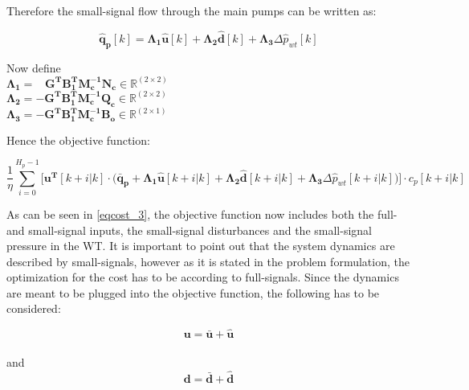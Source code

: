 Therefore the small-signal flow through the main pumps can be written as: 

 \begin{equation}
 \bm{\hat{q}_{p}}[k] =   \bm{\Lambda_1} \bm{\hat{u}}[k] + \bm{\Lambda_2} \bm{\hat{d}}[k] + \bm{\Lambda_3} \Delta \hat{p}_{wt}[k]
 \label{pumpflows_simplified}
\end{equation}

\begin{minipage}[t]{0.80\textwidth}
Now define\\
\hspace*{8mm} $\bm{\Lambda_1} = \,\,\,\,\, \bm{G^T} \bm{B_{1}^T}\bm{M_c^{-1}}\bm{N_c} \in \pmb{\mathbb{R}}^{(2 \times 2)}$ \\
\hspace*{8mm} $\bm{\Lambda_2} = -\bm{G^T} \bm{B_{1}^T}\bm{M_c^{-1}}\bm{Q_c} \in \pmb{\mathbb{R}}^{(2 \times 2)}$ \\
\hspace*{8mm} $\bm{\Lambda_3} = -\bm{G^T} \bm{B_{1}^T}\bm{M_c^{-1}}\bm{B_{o}} \in \pmb{\mathbb{R}}^{(2 \times 1)}$ 
\end{minipage}

Hence the objective function:

\begin{equation}
 \frac{1}{\eta}\! \sum_{i=0}^{H_p-1}\! \Big[ \bm{u^T}[k+i|k] \cdot \Big(\bm{\bar{q}_p} +  \bm{\Lambda_1} \bm{\hat{u}}[k+i|k] + \bm{\Lambda_2} \bm{\hat{d}}[k+i|k] + \bm{\Lambda_3} \Delta \hat{p}_{wt}[k+i|k]\!\Big)\!\Big] \! \cdot c_p[k+i|k]
\label{eqcost_3} 
\end{equation}

As can be seen in \eqref{eqcost_3}, the objective function now includes both the full- and small-signal inputs, the small-signal disturbances and the small-signal pressure in the WT. It is important to point out that the system dynamics are described by small-signals, however as it is stated in the problem formulation, the optimization for the cost has to be according to full-signals. Since the dynamics are meant to be plugged into the objective function, the following has to be considered: 

\begin{equation}
\bm{u} = \bm{\bar{u}} + \bm{\hat{u}}
\label{u_pred}
\end{equation}\\
and\\
\begin{equation}
\bm{d} = \bm{\bar{d}} + \bm{\hat{d}}
\end{equation}


